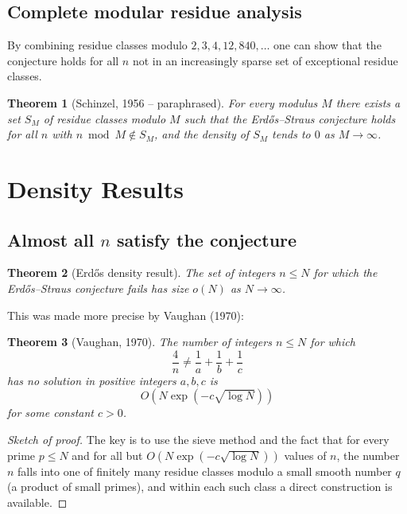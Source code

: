 \documentclass[12pt,a4paper]{amsart}
\newtheorem{theorem}{Theorem}[section]
\theoremstyle{definition}
\begin{document}
\subsection{Complete modular residue analysis}

By combining residue classes modulo $2, 3, 4, 12, 840, \ldots$ one
can show that the conjecture holds for all $n$ not in an increasingly
sparse set of exceptional residue classes.

\begin{theorem}[Schinzel, 1956 -- paraphrased]\label{thm:schinzel}
For every modulus $M$ there exists a set $S_M$ of residue classes
modulo $M$ such that the Erd\H{o}s--Straus conjecture holds for all $n$
with $n \bmod M \notin S_M$, and the density of $S_M$ tends to $0$
as $M \to \infty$.
\end{theorem}

\section{Density Results}

\subsection{Almost all $n$ satisfy the conjecture}

\begin{theorem}[Erd\H{o}s density result]\label{thm:density}
The set of integers $n \leq N$ for which the Erd\H{o}s--Straus conjecture
\emph{fails} has size $o(N)$ as $N \to \infty$.
\end{theorem}

This was made more precise by Vaughan (1970):

\begin{theorem}[Vaughan, 1970]\label{thm:vaughan}
The number of integers $n \leq N$ for which
\[
  \frac{4}{n} \neq \frac{1}{a} + \frac{1}{b} + \frac{1}{c}
\]
has no solution in positive integers $a, b, c$ is
\[
  O\!\left(N \exp(-c\sqrt{\log N})\right)
\]
for some constant $c > 0$.
\end{theorem}

\begin{proof}[Sketch of proof]
The key is to use the sieve method and the fact that for every prime
$p \leq N$ and for all but $O(N \exp(-c\sqrt{\log N}))$ values of $n$,
the number $n$ falls into one of finitely many residue classes modulo
a small smooth number $q$ (a product of small primes), and within each
such class a direct construction is available.
\end{proof}
\end{document}
